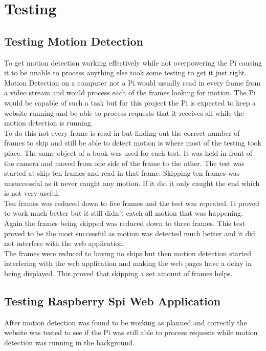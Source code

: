 \documentclass[]{report}
\begin{document}
\chapter{Testing}
\label{ch:test}
%
%
\section{Testing Motion Detection}
\label{sec:motionTest}
%
To get motion detection working effectively while not overpowering the Pi causing it to be unable to process anything else took some testing to get it just right. Motion Detection on a computer not a Pi would usually read in every frame from a video stream and would process each of the frames looking for motion. The Pi would be capable of such a task but for this project the Pi is expected to keep a website running and be able to process requests that it receives all while the motion detection is running.\\

 To do this not every frame is read in but finding out the correct number of frames to skip and still be able to detect motion is where most of the testing took place. The same object of a book was used for each test. It was held in front of the camera and moved from one side of the frame to the other. The test was started at skip ten frames and read in that frame. Skipping ten frames was unsuccessful as it never caught any motion. If it did it only caught the end which is not very useful. \\

Ten frames was reduced down to five frames and the test was repeated. It proved to work much better but it still didn’t catch all motion that was happening. Again the frames being skipped was reduced down to three frames. This test proved to be the most successful as motion was detected much better and it did not interfere with the web application. \\

The frames were reduced to having no skips but then motion detection started interfering with the web application and making the web pages have a delay in being displayed. This proved that skipping a set amount of frames helps.\\

\section{Testing Raspberry Spi Web Application}
\label{sec:websiteTest}
%
After motion detection was found to be working as planned and correctly the website was tested to see if the Pi was still able to process requests while motion detection was running in the background.\\
\end{document}
